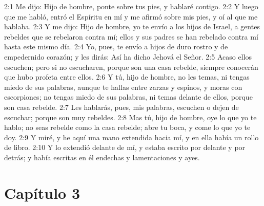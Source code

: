 2:1 Me dijo: Hijo de hombre, ponte sobre tus pies, y hablaré contigo.   
2:2 Y luego que me habló, entró el Espíritu en mí y me afirmó sobre mis pies, y oí al que me hablaba.   
2:3 Y me dijo: Hijo de hombre, yo te envío a los hijos de Israel, a gentes rebeldes que se rebelaron contra mí; ellos y sus padres se han rebelado contra mí hasta este mismo día.   
2:4 Yo, pues, te envío a hijos de duro rostro y de empedernido corazón; y les dirás: Así ha dicho Jehová el Señor.   
2:5 Acaso ellos escuchen; pero si no escucharen, porque son una casa rebelde, siempre conocerán que hubo profeta entre ellos.   
2:6 Y tú, hijo de hombre, no les temas, ni tengas miedo de sus palabras, aunque te hallas entre zarzas y espinos, y moras con escorpiones; no tengas miedo de sus palabras, ni temas delante de ellos, porque son casa rebelde.   
2:7 Les hablarás, pues, mis palabras, escuchen o dejen de escuchar; porque son muy rebeldes.   
2:8 Mas tú, hijo de hombre, oye lo que yo te hablo; no seas rebelde como la casa rebelde; abre tu boca, y come lo que yo te doy.   
2:9 Y miré, y he aquí una mano extendida hacia mí, y en ella había un rollo de libro.   
2:10 Y lo extendió delante de mí, y estaba escrito por delante y por detrás; y había escritas en él endechas y lamentaciones y ayes.   
\section*{Capítulo 3  }
  
